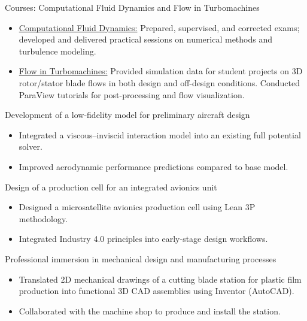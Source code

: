 \documentclass[10pt,a4paper,ragged2e,withhyper]{altacv}
\begin{document}
\divider

\textcolor{myRed}{Courses: Computational Fluid Dynamics and Flow in Turbomachines}
\begin{itemize}[leftmargin=1.5em]
  \item \href{https://www.programmes.uliege.be/cocoon/20242025/cours/AERO0030-1.html}{Computational Fluid Dynamics:} Prepared, supervised, and corrected exams; developed and delivered practical sessions on numerical methods and turbulence modeling.
  \item \href{https://www.programmes.uliege.be/cocoon/20242025/cours/MECA0032-1.html}{Flow in Turbomachines:} Provided simulation data for student projects on 3D rotor/stator blade flows in both design and off-design conditions. Conducted ParaView tutorials for post-processing and flow visualization.
\end{itemize}

\divider

\textcolor{myRed}{Development of a low-fidelity model for preliminary aircraft design}
\begin{itemize}[leftmargin=1.5em]
    \item Integrated a viscous–inviscid interaction model into an existing full potential solver.
    \item Improved aerodynamic performance predictions compared to base model.
\end{itemize}

\divider

\textcolor{myRed}{Design of a production cell for an integrated avionics unit}
\begin{itemize}[leftmargin=1.5em]
  \item Designed a microsatellite avionics production cell using Lean 3P methodology.
  \item Integrated Industry 4.0 principles into early-stage design workflows.
\end{itemize}

\divider

\textcolor{myRed}{Professional immersion in mechanical design and manufacturing processes}
\begin{itemize}[leftmargin=1.5em]
  \item Translated 2D mechanical drawings of a cutting blade station for plastic film production into functional 3D CAD assemblies using Inventor (AutoCAD).
  \item Collaborated with the machine shop to produce and install the station.
\end{itemize}
\end{document}
